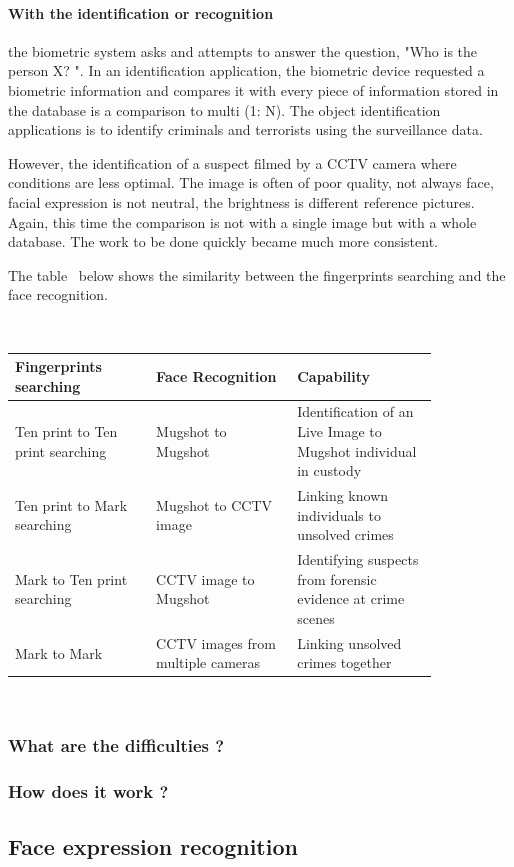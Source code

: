 \paragraph{With the identification or recognition} the biometric system asks and attempts to answer the question, "Who is the person X? ". In an identification application, the biometric device requested a biometric information and compares it with every piece of information stored in the database is a comparison to multi (1: N). The object identification applications is to identify criminals and terrorists using the surveillance data.

However, the identification of a suspect filmed by a CCTV camera where conditions are less optimal.
The image is often of poor quality, not always face, facial expression is not neutral, the brightness is different reference pictures.
Again, this time the comparison is not with a single image but with a whole database. The work to be done quickly became much more consistent.

The table~\cite{NPIA} below shows the similarity between the fingerprints searching and the face recognition.

~\\
\begin{tabular}{|p{0.28\linewidth}|p{0.28\linewidth}|p{0.28\linewidth}|}
\hline
\textbf{Fingerprints searching}&\textbf{Face Recognition}&\textbf{Capability}\\
\hline
Ten print to Ten print searching&Mugshot to Mugshot&Identification of an Live Image to Mugshot individual in custody\\
\hline
Ten print to Mark searching&Mugshot to CCTV image&Linking known individuals to unsolved crimes\\
\hline
Mark to Ten print searching&CCTV image to Mugshot&Identifying suspects from forensic evidence at crime scenes\\
\hline
Mark to Mark&CCTV images from multiple cameras&Linking unsolved crimes together\\
\hline
\end{tabular}

~\\
\subsubsection{What are the difficulties ? }
\subsubsection{How does it work ? }

\subsection{Face expression recognition}

